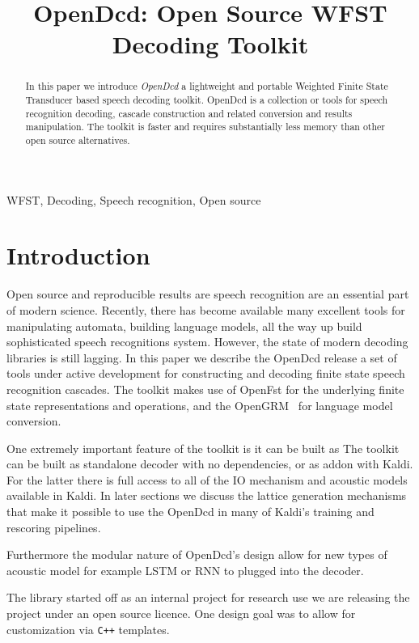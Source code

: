 \documentclass{article}
\title{OpenDcd: Open Source WFST Decoding Toolkit}
\begin{document}
%
\maketitle
%
\begin{abstract}
In this paper we introduce \emph{OpenDcd} a lightweight and portable Weighted Finite State
Transducer based speech decoding toolkit. OpenDcd is a collection or tools for speech
recognition decoding, cascade construction and related conversion and results manipulation.
The toolkit is faster and requires substantially less memory than other open source alternatives.
\end{abstract}
%
\begin{keywords}
WFST, Decoding, Speech recognition, Open source
\end{keywords}
%
\section{Introduction}
\label{sec:intro}
Open source and reproducible results are speech recognition are an essential
part of modern science. Recently, there has become available many excellent
tools for manipulating automata, building language models, all the way up
build sophisticated speech recognitions system.  However, the state of modern 
decoding libraries is still lagging. In this paper we describe the OpenDcd
release a set of tools under active development for constructing and decoding
finite state speech recognition cascades. The toolkit makes use of OpenFst for the 
underlying finite state representations
and operations, and the OpenGRM~\cite{roark12} for language model conversion.

One extremely important feature of the toolkit is it can be built as 
The toolkit can be built as standalone decoder with no dependencies, or as addon
with Kaldi. For the latter there is full access to all of the IO mechanism and 
acoustic models available in Kaldi. In later sections we discuss the lattice generation
mechanisms that make it possible to use the OpenDcd in many of Kaldi's training and
rescoring pipelines. 

Furthermore the modular nature of OpenDcd's  design allow for new types of 
acoustic model for example LSTM or RNN to plugged into the decoder. 

The library started off as an internal project for research use we are
releasing the project under an open source licence. One design goal was 
to allow for customization via \texttt{C++} templates.
\end{document}
